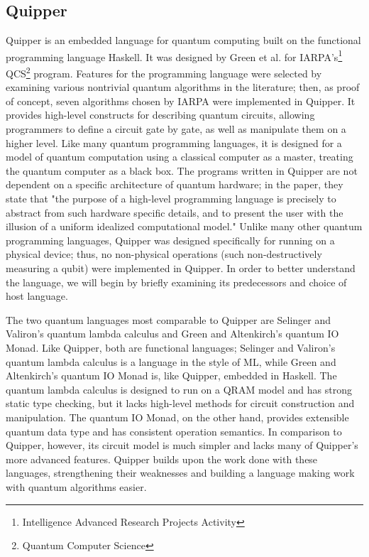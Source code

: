 \documentclass[]{article}
\begin{document}
\subsection{Quipper}
Quipper is an embedded language for quantum computing built on the functional programming language Haskell. It was designed by Green et al. for IARPA's\footnote{Intelligence Advanced Research Projects Activity} QCS\footnote{Quantum Computer Science} program. Features for the programming language were selected by examining various nontrivial quantum algorithms in the literature; then, as proof of concept, seven algorithms chosen by IARPA were implemented in Quipper. It provides high-level constructs for describing quantum circuits, allowing programmers to define a circuit gate by gate, as well as manipulate them on a higher level. Like many quantum programming languages, it is designed for a model of quantum computation using a classical computer as a master, treating the quantum computer as a black box. The programs written in Quipper are not dependent on a specific architecture of quantum hardware; in the paper, they state that "the purpose of a high-level programming language is precisely to abstract from such hardware specific details, and to present the user with the illusion of a uniform idealized computational model." Unlike many other quantum programming languages, Quipper was designed specifically for running on a physical device; thus, no non-physical operations (such non-destructively measuring a qubit) were implemented in Quipper. In order to better understand the language, we will begin by briefly examining its predecessors and choice of host language.

The two quantum languages most comparable to Quipper are Selinger and Valiron's quantum lambda calculus and Green and Altenkirch's quantum IO Monad. Like Quipper, both are functional languages; Selinger and Valiron's quantum lambda calculus is a language in the style of ML, while Green and Altenkirch's quantum IO Monad is, like Quipper, embedded in Haskell. The quantum lambda calculus is designed to run on a QRAM model and has strong static type checking, but it lacks high-level methods for circuit construction and manipulation. The quantum IO Monad, on the other hand, provides extensible quantum data type and has consistent operation semantics. In comparison to Quipper, however, its circuit model is much simpler and lacks many of Quipper's more advanced features. Quipper builds upon the work done with these languages, strengthening their weaknesses and building a language making work with quantum algorithms easier.
\end{document}
